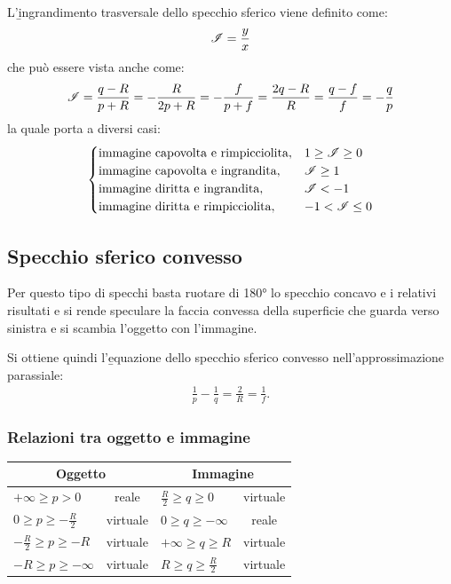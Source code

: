 L'\b{ingrandimento trasversale} dello specchio sferico viene definito come:
\begin{equation}\begin{split}
\mathcal{I}=\frac{y}{x}
\end{split}\end{equation}
che può essere vista anche come:
\begin{equation}\begin{split}
\mathcal{I}=\frac{q-R}{p+R}=-\frac{R}{2p+R}=-\frac{f}{p+f}=\frac{2q-R}{R}=\frac{q-f}{f}=-\frac{q}{p}
\end{split}\end{equation}
la quale porta a diversi casi:
\begin{equation}\begin{split}
\begin{cases}
\textrm{immagine capovolta e rimpicciolita}, & 1\ge\mathcal{I}\ge0\\
\textrm{immagine capovolta e ingrandita}, & \mathcal{I}\ge1\\
\textrm{immagine diritta e ingrandita}, & \mathcal{I}<-1\\
\textrm{immagine diritta e rimpicciolita}, & -1<\mathcal{I}\le0
\end{cases}
\end{split}\end{equation}

\subsection{Specchio sferico convesso}
Per questo tipo di specchi basta ruotare di \ang{180;;} lo specchio concavo e i relativi risultati e si rende speculare la faccia convessa della superficie che guarda verso sinistra e si scambia l'oggetto con l'immagine.

Si ottiene quindi l'\b{equazione dello specchio sferico convesso nell'approssimazione parassiale}:
\begin{equation}\begin{split}
\frac{1}{p}-\frac{1}{q}=\frac{2}{R}=\frac{1}{f}.
\end{split}\end{equation}

\subsubsection{Relazioni tra oggetto e immagine}
\begin{center}
\begin{tabularx}{\textwidth}{Xc| Xc}
\toprule
\multicolumn{2}{c}{Oggetto} 			& \multicolumn{2}{c}{Immagine} 	\\
\midrule
$+\infty\ge p> 0$ 		& reale 		& $\frac{R}{2}\ge q\ge 0$ 		& virtuale\\[2ex]
$0\ge p\ge -\frac{R}{2}$ 	& virtuale 		& $0\ge q\ge -\infty$ 			& reale\\[2ex]
$-\frac{R}{2}\ge p\ge -R$ 	& virtuale 		& $+\infty\ge q \ge R$ 			& virtuale\\[2ex]
$-R \ge p\ge -\infty$ 		& virtuale 		& $R\ge q\ge \frac{R}{2}$ 		& virtuale\\[2ex]
\bottomrule
\end{tabularx}
\end{center}

